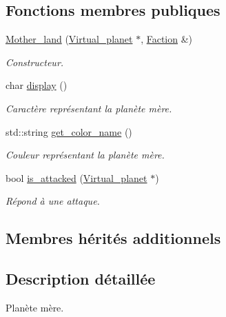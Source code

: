 \subsection*{Fonctions membres publiques}
\begin{DoxyCompactItemize}
\item 
\hyperlink{classMother__land_a8fd578b591a99a926bebd55959492997}{Mother\-\_\-land} (\hyperlink{classVirtual__planet}{Virtual\-\_\-planet} $\ast$, \hyperlink{classFaction}{Faction} \&)
\begin{DoxyCompactList}\small\item\em Constructeur. \end{DoxyCompactList}\item 
\hypertarget{classMother__land_ae50ab9634b50efcb8a9f0fe275342923}{char \hyperlink{classMother__land_ae50ab9634b50efcb8a9f0fe275342923}{display} ()}\label{classMother__land_ae50ab9634b50efcb8a9f0fe275342923}

\begin{DoxyCompactList}\small\item\em Caractère représentant la planète mère. \end{DoxyCompactList}\item 
\hypertarget{classMother__land_a2a862d8ca3bf717ef885edc50ea92a8d}{std\-::string \hyperlink{classMother__land_a2a862d8ca3bf717ef885edc50ea92a8d}{get\-\_\-color\-\_\-name} ()}\label{classMother__land_a2a862d8ca3bf717ef885edc50ea92a8d}

\begin{DoxyCompactList}\small\item\em Couleur représentant la planète mère. \end{DoxyCompactList}\item 
bool \hyperlink{classMother__land_a295325cdedbfcfb17c200a4a7438761c}{is\-\_\-attacked} (\hyperlink{classVirtual__planet}{Virtual\-\_\-planet} $\ast$)
\begin{DoxyCompactList}\small\item\em Répond à une attaque. \end{DoxyCompactList}\end{DoxyCompactItemize}
\subsection*{Membres hérités additionnels}


\subsection{Description détaillée}
Planète mère. 

